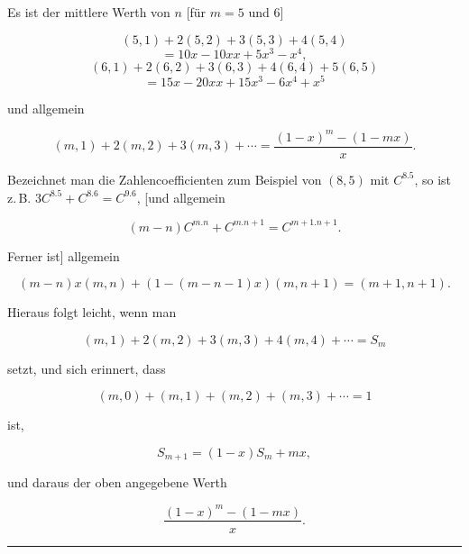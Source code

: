 \clearpage
{}
Es ist der mittlere Werth von $n$ [für $m=5$ und $6$]

\[
(5,1)+2(5,2)+3(5,3)+4(5,4)
\]
\[
= 10x-10xx+5x^3-x^4,
\]
\[
(6,1)+2(6,2)+3(6,3)+4(6,4)+5(6,5)
\]
\[
= 15x-20xx+15x^3-6x^4+x^5
\]

und allgemein

\[
(m,1)+2(m,2)+3(m,3)+\cdots = \frac{(1-x)^m-(1-mx)}{x}.
\]

Bezeichnet man die Zahlencoefficienten zum Beispiel von $(8,5)$ mit
$C^{8.5}$, so ist z.\,B. $3C^{8.5}+C^{8.6}=C^{9.6}$,
[und allgemein

\[
(m-n)C^{m.n}+C^{m.n+1}=C^{m+1.n+1}.
\]

Ferner ist] allgemein

\[
(m-n)x(m,n)+(1-(m-n-1)x)(m,n+1)=(m+1,n+1).
\]

Hieraus folgt leicht, wenn man

\[
(m,1)+2(m,2)+3(m,3)+4(m,4)+\cdots = S_m
\]

setzt, und sich erinnert, dass

\[
(m,0)+(m,1)+(m,2)+(m,3)+\cdots = 1
\]

ist,

\[
S_{m+1} = (1-x)S_m+mx,
\]

und daraus der oben angegebene Werth

\[
\frac{(1-x)^m-(1-mx)}{x}.
\]

\bigskip
\hrule
